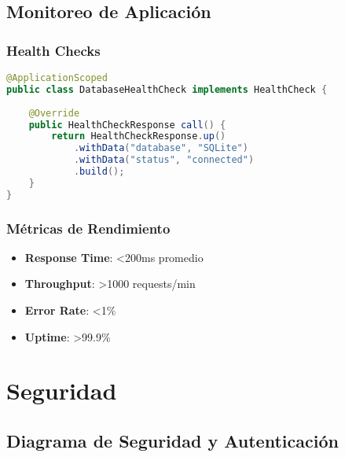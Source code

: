 \documentclass[12pt,a4paper]{article}
\begin{document}
\subsection{Monitoreo de Aplicación}

\subsubsection{Health Checks}
\begin{lstlisting}[language=java]
@ApplicationScoped
public class DatabaseHealthCheck implements HealthCheck {
    
    @Override
    public HealthCheckResponse call() {
        return HealthCheckResponse.up()
            .withData("database", "SQLite")
            .withData("status", "connected")
            .build();
    }
}
\end{lstlisting}

\subsubsection{Métricas de Rendimiento}
\begin{itemize}
    \item \textbf{Response Time}: <200ms promedio
    \item \textbf{Throughput}: >1000 requests/min
    \item \textbf{Error Rate}: <1\%
    \item \textbf{Uptime}: >99.9\%
\end{itemize}

\section{Seguridad}

\subsection{Diagrama de Seguridad y Autenticación}
\end{document}
